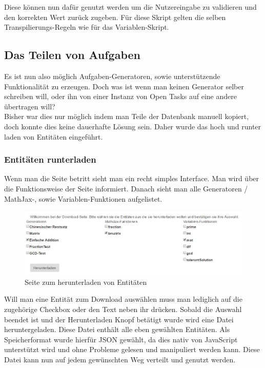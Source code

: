 Diese können nun dafür genutzt werden um die Nutzereingabe zu validieren und den korrekten Wert zurück zugeben. Für diese Skript gelten die selben Transpilierungs-Regeln wie für das Variablen-Skript.


\subsection{Das Teilen von Aufgaben}

Es ist nun also möglich Aufgaben-Generatoren, sowie unterstützende Funktionalität zu erzeugen. Doch was ist wenn man keinen Generator selber schreiben will, oder ihn von einer Instanz von Open Tasks auf eine andere übertragen will? \\
Bisher war dies nur möglich indem man Teile der Datenbank manuell kopiert, doch konnte dies keine dauerhafte Lösung sein. Daher wurde das hoch und runter laden von Entitäten eingeführt.
\subsubsection{Entitäten runterladen}


Wenn man die Seite betritt sieht man ein recht simples Interface. Man wird über die Funktionsweise der Seite informiert. Danach sieht man alle Generatoren / MathJax-, sowie Variablen-Funktionen aufgelistet. \\

\begin{figure}[htp]     %
\centering
\includegraphics[width=1\textwidth]{bilder/DownloadEntities} 
\caption[Seite zum herunterladen von Entitäten]{Seite zum herunterladen von Entitäten}
\end{figure} 


Will man eine Entität zum Download auswählen muss man lediglich auf die zugehörige Checkbox oder den Text neben ihr drücken. Sobald die Auswahl beendet ist und der Herunterladen Knopf betätigt wurde wird eine Datei heruntergeladen. Diese Datei enthält alle eben gewählten Entitäten. Als Speicherformat wurde hierfür JSON gewählt, da dies nativ von JavaScript unterstützt wird und ohne Probleme gelesen und manipuliert werden kann. Diese Datei kann nun auf jedem gewünschten Weg verteilt und genutzt werden.


